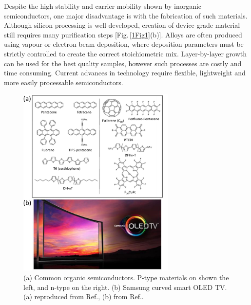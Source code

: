 Despite the high stability and carrier mobility shown by inorganic semiconductors, one major disadvantage is with the fabrication of such materials. Although silicon processing is well-developed, creation of device-grade material still requires many purification steps [Fig.\,\ref{1Fig1}(b)]. Alloys are often produced using vapour or electron-beam deposition, where deposition parameters must be strictly controlled to create the correct stoichiometric mix. Layer-by-layer growth can be used for the best quality samples, however such processes are costly and time consuming. Current advances in technology require flexible, lightweight and more easily processable semiconductors.

\begin{figure}[h!]
\centering
\includegraphics[width=0.7\textwidth]{Fig2}
\caption{(a) Common organic semiconductors. P-type materials on shown the left, and n-type on the right. (b) Samsung curved smart OLED TV. (a) reproduced from Ref.\!, (b) from Ref.\!.}
\label{1Fig2}
\end{figure}
